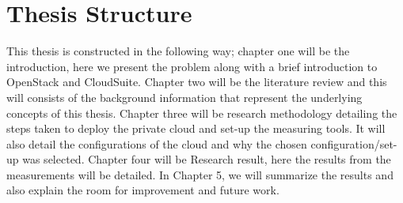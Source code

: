 \section{Thesis Structure}
This thesis is constructed in the following way; chapter one will be the introduction, here we present the problem along with a brief introduction to OpenStack and CloudSuite. Chapter two will be the literature review and this will consists of the background information that represent the underlying concepts of this thesis. Chapter three will be research methodology detailing the steps taken to deploy the private cloud and set-up the measuring tools. It will also detail the configurations of the cloud and why the chosen configuration/set-up was selected. Chapter four will be Research result, here the results from the measurements will be detailed. In Chapter 5, we will summarize the results and also explain the room for improvement and future work.